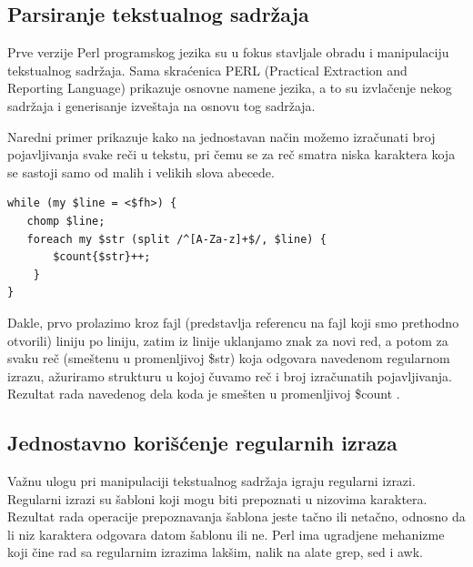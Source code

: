 \documentclass[a4paper]{article}
\begin{document}
\subsection{Parsiranje tekstualnog sadržaja}

Prve verzije Perl programskog jezika su u fokus stavljale obradu i manipulaciju tekstualnog sadržaja. Sama skra\'cenica PERL (Practical Extraction and Reporting Language) prikazuje osnovne namene jezika, a to su izvlačenje nekog sadržaja i generisanje izveštaja na osnovu tog sadržaja.

Naredni primer prikazuje kako na jednostavan način možemo izračunati broj pojavljivanja svake reči u tekstu, pri čemu se za reč smatra niska karaktera koja se sastoji samo od malih i velikih slova abecede.

\begin{lstlisting}[label=simple]
while (my $line = <$fh>) {
   chomp $line;
   foreach my $str (split /^[A-Za-z]+$/, $line) {
       $count{$str}++;
    } 
}
\end{lstlisting}


Dakle, prvo prolazimo kroz fajl (predstavlja referencu na fajl koji smo 
prethodno otvorili) liniju po liniju, zatim iz linije uklanjamo znak za novi red, a potom za svaku reč (smeštenu u promenljivoj \$str) koja odgovara navedenom regularnom izrazu, ažuriramo strukturu u kojoj čuvamo reč i broj izračunatih pojavljivanja. Rezultat rada navedenog 
dela koda je smešten u promenljivoj \$count \cite{cooksnd}.


\subsection{Jednostavno korišćenje regularnih izraza}

Važnu ulogu pri manipulaciji tekstualnog sadržaja igraju regularni izrazi. Regularni izrazi su šabloni koji mogu biti prepoznati u nizovima karaktera. Rezultat rada operacije prepoznavanja šablona jeste tačno ili netačno, odnosno da li niz karaktera odgovara datom šablonu ili ne. Perl ima ugradjene mehanizme koji čine rad sa regularnim izrazima lakšim, nalik na alate grep, sed i awk.\cite{sed} %
\end{document}
